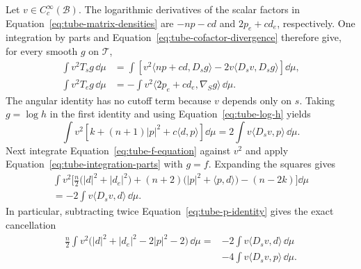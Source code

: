 Let $v\in C_c^\infty(\mathcal B)$.  The logarithmic derivatives of the
scalar factors in Equation~\eqref{eq:tube-matrix-densities} are
$-np-cd$ and $2p_e+cd_e$, respectively.  One integration by parts and
Equation~\eqref{eq:tube-cofactor-divergence} therefore give, for every
smooth $g$ on $\mathcal T$,
\begin{equation}\label{eq:tube-integration-parts}
 \begin{split}
 \int v^2T_sg\,\dd\mu
 &=\int\left[
   v^2\langle np+cd,D_sg\rangle
   -2v\langle D_sv,D_sg\rangle\right]\dd\mu,\\
 \int v^2T_eg\,\dd\mu
 &=-\int v^2\langle2p_e+cd_e,\nabla_Sg\rangle\,\dd\mu.
 \end{split}
\end{equation}
The angular identity has no cutoff term because $v$ depends only on
$s$.  Taking $g=\log h$ in the first identity and using
Equation~\eqref{eq:tube-log-h} yields
\begin{equation}\label{eq:tube-p-identity}
 \int v^2\left[k+(n+1)|p|^2+c\langle d,p\rangle\right]\dd\mu
 =2\int v\langle D_sv,p\rangle\,\dd\mu.
\end{equation}
Next integrate Equation~\eqref{eq:tube-f-equation} against $v^2$ and
apply Equation~\eqref{eq:tube-integration-parts} with $g=f$.  Expanding
the squares gives
\begin{equation}\label{eq:tube-d-identity}
 \begin{split}
 \int v^2\biggl[\frac n2\bigl(|d|^2+|d_e|^2\bigr)
  +(n+2)\bigl(|p|^2+\langle p,d\rangle\bigr)
  -(n-2k)\biggr]\dd\mu\\
 =-2\int v\langle D_sv,d\rangle\,\dd\mu.
 \end{split}
\end{equation}
In particular, subtracting twice
Equation~\eqref{eq:tube-p-identity} gives the exact cancellation
\begin{equation}\label{eq:tube-cancellation}
 \begin{split}
 \frac n2\int v^2
  \bigl(|d|^2+|d_e|^2-2|p|^2-2\bigr)\,\dd\mu
 ={}&-2\int v\langle D_sv,d\rangle\,\dd\mu\\
    &-4\int v\langle D_sv,p\rangle\,\dd\mu.
 \end{split}
\end{equation}

